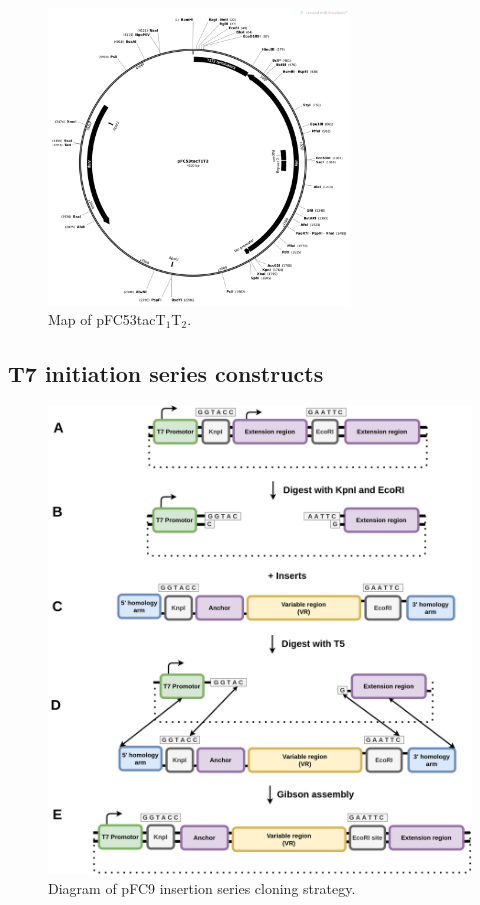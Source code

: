\documentclass[11pt]{article}
\begin{document}
\begin{figure}[H]
	\includegraphics[width=8cm]{images/plasmid_maps/pFC53tacT1T2_Map.png}
	\centering
	\caption{Map of pFC53tacT$_1$T$_2$.}
	\label{fig:map_pFC53tacT1T2}
\end{figure}


\subsection{T7 initiation series constructs}
\label{T7:init} 


\begin{figure}[H]
	\includegraphics[width=15cm]{images/cloning_diagrams/construct_diagrams-T7-Initiation-series.png}
	\centering
	\caption{Diagram of pFC9 insertion series cloning strategy.}
	\label{clone:T7-insert}
\end{figure}
\end{document}
